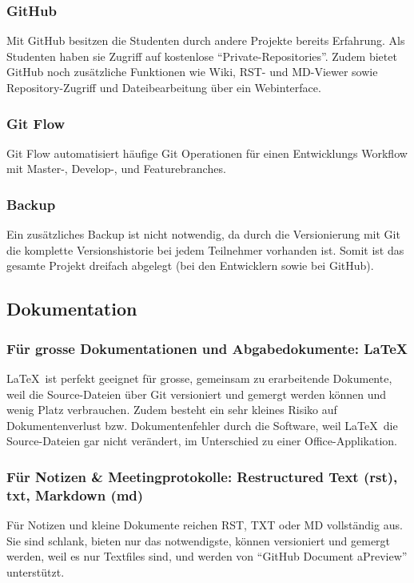 			\subsubsection{GitHub}
				Mit GitHub besitzen die Studenten durch andere Projekte bereits Erfahrung. Als
				Studenten haben sie Zugriff auf kostenlose "`Private-Repositories"'. Zudem
				bietet GitHub noch zusätzliche Funktionen wie Wiki, RST- und MD-Viewer sowie
				Repository-Zugriff und Dateibearbeitung über ein Webinterface.
				
			\subsubsection{Git Flow}
				Git Flow automatisiert häufige Git Operationen für einen Entwicklungs Workflow mit Master-, Develop-, und Featurebranches.

			\subsubsection{Backup}
				Ein zusätzliches Backup ist nicht notwendig, da durch die Versionierung mit Git die komplette Versionshistorie bei jedem Teilnehmer vorhanden ist. Somit ist das gesamte Projekt dreifach abgelegt (bei den Entwicklern sowie bei GitHub).


		\subsection{Dokumentation}
			\subsubsection{Für grosse Dokumentationen und Abgabedokumente: \LaTeX}
				\LaTeX\ ist perfekt geeignet für grosse, gemeinsam zu erarbeitende Dokumente,
				weil die Source-Dateien über Git versioniert und gemergt werden können und wenig
				Platz verbrauchen. Zudem besteht ein sehr kleines Risiko auf Dokumentenverlust
				bzw. Dokumentenfehler durch die Software, weil \LaTeX\ die Source-Dateien gar
				nicht verändert, im Unterschied zu einer Office-Applikation.

			\subsubsection{Für Notizen \& Meetingprotokolle: Restructured Text (rst), txt, Markdown (md)}
				Für Notizen und kleine Dokumente reichen RST, TXT oder MD vollständig aus. Sie
				sind schlank, bieten nur das notwendigste, können versioniert und gemergt
				werden, weil es nur Textfiles sind, und werden von "`GitHub Document aPreview"'
				unterstützt.

